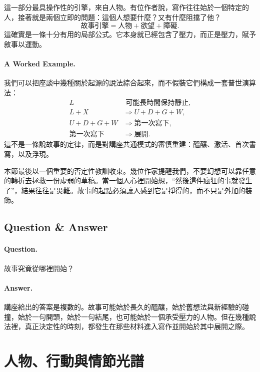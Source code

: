 這一部分最具操作性的引擎，來自人物。有位作者說，寫作往往始於一個特定的人，接著就是兩個立即的問題：這個人想要什麼？又有什麼阻擋了他？
\begin{equation}
\text{故事引擎} = \text{人物} + \text{欲望} + \text{障礙}.
\end{equation}
這確實是一條十分有用的局部公式。它本身就已經包含了壓力，而正是壓力，賦予敘事以運動。

\paragraph{A Worked Example.} 我們可以把座談中幾種關於起源的說法綜合起來，而不假裝它們構成一套普世演算法：
\begin{align}
L &\text{ 可能長時間保持靜止},\\
L + X &\Rightarrow U + D + G + W,\\
U + D + G + W &\Rightarrow \text{第一次寫下},\\
\text{第一次寫下} &\Rightarrow \text{展開}.
\end{align}
這不是一條說故事的定律，而是對講座共通模式的審慎重建：醞釀、激活、首次書寫，以及浮現。

本節最後以一個重要的否定性教訓收束。幾位作家提醒我們，不要幻想可以靠任意的轉折去拯救一份虛弱的草稿。當一個人心裡開始想，``然後這件瘋狂的事就發生了''，結果往往是災難。故事的起點必須讓人感到它是掙得的，而不只是外加的裝飾。

\subsection{Question \& Answer}

\paragraph{Question.} 故事究竟從哪裡開始？

\paragraph{Answer.} 講座給出的答案是複數的。故事可能始於長久的醞釀，始於舊想法與新經驗的碰撞，始於一句開頭，始於一句結尾，也可能始於一個承受壓力的人物。但在幾種說法裡，真正決定性的時刻，都發生在那些材料進入寫作並開始於其中展開之際。

\section{人物、行動與情節光譜}

